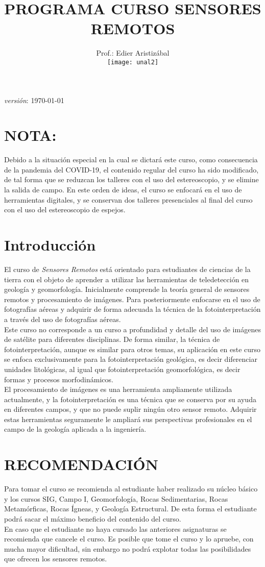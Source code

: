 \documentclass[a4paper,twoside,11pt,]{article}
\title {PROGRAMA  CURSO SENSORES REMOTOS}
\author{Prof.: Edier Aristizábal\\[5ex]
\texttt{[image: unal2]}
}
\date{}
\begin{document}
\maketitle

\emph {versión}: \today

\section*{NOTA:}
Debido a la situación especial en la cual se dictará este curso, como consecuencia de la pandemia del COVID-19, el contenido regular del curso ha sido modificado,
de tal forma que se reduzcan los talleres con el uso del estereoscopio, y se elimine la salida de campo. En este orden de ideas, el curso se enfocará en el uso de herramientas
digitales, y se conservan dos talleres presenciales al final del curso con el uso del estereoscopio de espejos.

\section* {Introducción}
El curso de \emph{Sensores Remotos} está orientado para estudiantes de ciencias de la tierra con el objeto de aprender a utilizar las herramientas de teledetección en geología y geomorfología. Inicialmente comprende la teoría general de sensores remotos y procesamiento de imágenes. Para posteriormente enfocarse en el uso de fotografías aéreas y adquirir de forma adecuada la técnica de la fotointerpretación a través del uso de fotografías aéreas.\\ 
Este curso no corresponde a un curso a profundidad y detalle del uso de imágenes de satélite para diferentes disciplinas. De forma similar, la técnica de fotointerpretación, aunque es similar para otros temas, su aplicación en este curso se enfoca exclusivamente para la fotointerpretación geológica, es decir diferenciar unidades litológicas, al igual que fotointerpretación geomorfológica, es decir formas y procesos morfodinámicos.\\
El procesamiento de imágenes es una herramienta ampliamente utilizada actualmente, y la fotointerpretación es una técnica que se conserva por su ayuda en diferentes campos, y que no puede suplir ningún otro sensor remoto. Adquirir estas herramientas seguramente le ampliará sus perspectivas profesionales en el campo de la geología aplicada a la ingeniería.

\section{RECOMENDACIÓN}
Para tomar el curso se recomienda al estudiante haber realizado su núcleo básico y los cursos SIG, Campo I, Geomorfología, Rocas Sedimentarias, Rocas Metamórficas, Rocas Ígneas, y Geología Estructural. De esta forma el estudiante podrá sacar el máximo beneficio del contenido del curso.\\
En caso que el estudiante no haya cursado las anteriores asignaturas se recomienda que cancele el curso. Es posible que tome el curso y lo apruebe, con mucha mayor dificultad, sin embargo no podrá explotar todas las posibilidades que ofrecen los sensores remotos.
\end{document}
